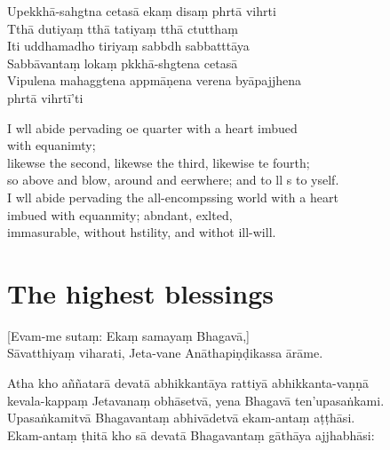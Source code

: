 
\clearpage

Upekkhā-sahgtna cetasā ekaṃ disaṃ phrtā vihrti\\%
Tthā dutiyaṃ tthā tatiyaṃ tthā ctutthaṃ\\
Iti uddhamadho tiriyaṃ sabbdh sabbatttāya\\
Sabbāvantaṃ lokaṃ pkkhā-shgtena cetasā\\
Vipulena mahaggtena appmāṇena verena byāpajjhena\\
\vin phrtā vihrtī'ti

\clearpage

I wll abide pervading oe quarter with a heart imbued\\%
\vin with equanimty;\\
likewse the second, likewse the third, likewise te fourth;\\
so above and blow, around and eerwhere; and to ll s to yself.\\
I wll abide pervading the all-encompssing world with a heart \\
imbued with equanmity; abndant, exlted,\\
\vin immasurable, without hstility, and withot ill-will.

\clearpage

\chapter{The highest blessings}%

\begin{leader}
\end{leader}

[Evam-me sutaṃ: Ekaṃ samayaṃ Bhagavā,]\\
Sāvatthiyaṃ viharati, Jeta-vane Anāthapiṇḍikassa ārāme.

Atha kho aññatarā devatā abhikkantāya rattiyā abhikkanta-vaṇṇā\\
kevala-kappaṃ Jetavanaṃ obhāsetvā, yena Bhagavā ten’upasaṅkami.\\
Upasaṅkamitvā Bhagavantaṃ abhivādetvā ekam-antaṃ aṭṭhāsi.\\
Ekam-antaṃ ṭhitā kho sā devatā Bhagavantaṃ gāthāya ajjhabhāsi:

